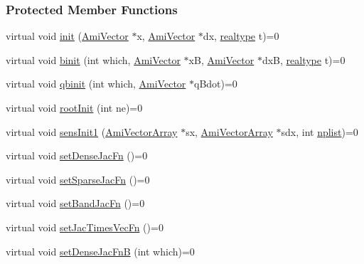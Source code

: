 \subsubsection*{Protected Member Functions}
\begin{DoxyCompactItemize}
\item 
virtual void \mbox{\hyperlink{classamici_1_1_solver_a566d267fa2815fe0dd3c29d44f68209b}{init}} (\mbox{\hyperlink{classamici_1_1_ami_vector}{Ami\+Vector}} $\ast$x, \mbox{\hyperlink{classamici_1_1_ami_vector}{Ami\+Vector}} $\ast$dx, \mbox{\hyperlink{namespaceamici_a1bdce28051d6a53868f7ccbf5f2c14a3}{realtype}} t)=0
\item 
virtual void \mbox{\hyperlink{classamici_1_1_solver_a14a9fe177339143801b38baeb800317a}{binit}} (int which, \mbox{\hyperlink{classamici_1_1_ami_vector}{Ami\+Vector}} $\ast$xB, \mbox{\hyperlink{classamici_1_1_ami_vector}{Ami\+Vector}} $\ast$dxB, \mbox{\hyperlink{namespaceamici_a1bdce28051d6a53868f7ccbf5f2c14a3}{realtype}} t)=0
\item 
virtual void \mbox{\hyperlink{classamici_1_1_solver_a57c1900d556ab878f5fad94b4fcd1abd}{qbinit}} (int which, \mbox{\hyperlink{classamici_1_1_ami_vector}{Ami\+Vector}} $\ast$q\+Bdot)=0
\item 
virtual void \mbox{\hyperlink{classamici_1_1_solver_a0bb31b3b358751d4447199e2732db932}{root\+Init}} (int ne)=0
\item 
virtual void \mbox{\hyperlink{classamici_1_1_solver_a9e5cc83868435443926cde99c1a1d864}{sens\+Init1}} (\mbox{\hyperlink{classamici_1_1_ami_vector_array}{Ami\+Vector\+Array}} $\ast$sx, \mbox{\hyperlink{classamici_1_1_ami_vector_array}{Ami\+Vector\+Array}} $\ast$sdx, int \mbox{\hyperlink{classamici_1_1_solver_a9a135f04f34dbf45cf980b97e6906665}{nplist}})=0
\item 
virtual void \mbox{\hyperlink{classamici_1_1_solver_abb3355b298fb576e7bcd3f333d14b5af}{set\+Dense\+Jac\+Fn}} ()=0
\item 
virtual void \mbox{\hyperlink{classamici_1_1_solver_aabf68f0f9ee981fd320420f3ba5c5f8d}{set\+Sparse\+Jac\+Fn}} ()=0
\item 
virtual void \mbox{\hyperlink{classamici_1_1_solver_a1ac4c2c1cf9df3c478ade2b1d5e728c6}{set\+Band\+Jac\+Fn}} ()=0
\item 
virtual void \mbox{\hyperlink{classamici_1_1_solver_a151ebe8ad33f1e635289c869d1412375}{set\+Jac\+Times\+Vec\+Fn}} ()=0
\item 
virtual void \mbox{\hyperlink{classamici_1_1_solver_a1081b1ac835a2bf9221552a07d04ef4d}{set\+Dense\+Jac\+FnB}} (int which)=0

\end{DoxyCompactItemize}
